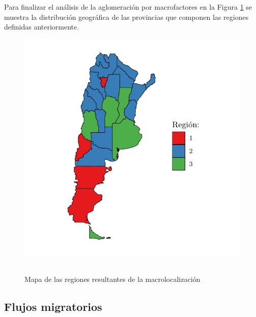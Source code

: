 \documentclass[12pt,a4paper]{article}
\begin{document}
\newpage
Para finalizar el análisis de la aglomeración por macrofactores en la Figura \ref{figure:mapa_reg} se muestra la distribución geográfica de las provincias que componen las regiones definidas anteriormente.
\begin{figure}[ht!]
\begin{center}
\caption{\\Mapa de las regiones resultantes de la macrolocalización}
\includegraphics[scale=0.7]{./graficos/mapa_regiones.pdf}
\label{figure:mapa_reg}
\end{center}
\end{figure}
\newpage

\subsection{Flujos migratorios}
\end{document}
